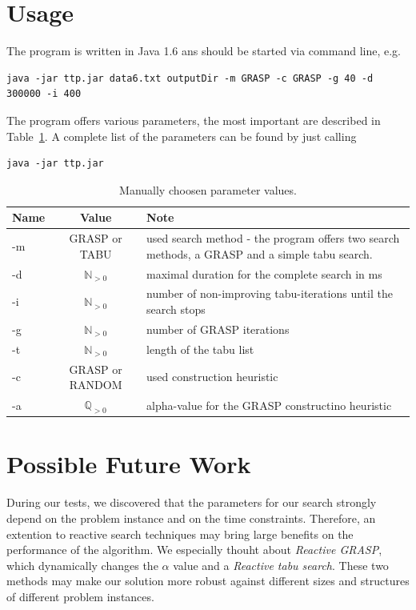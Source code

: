 \documentclass[a4paper,11pt]{article}
\begin{document}
\section{Usage}
The program is written in Java 1.6 ans should be started via command line, e.g.
\small
\lstset{language=sh}
\begin{lstlisting}
java -jar ttp.jar data6.txt outputDir -m GRASP -c GRASP -g 40 -d 300000 -i 400
\end{lstlisting}

The program offers various parameters, the most important are described in Table~\ref{tab:program}. A complete list of the parameters can be found by just calling 
\begin{lstlisting}
java -jar ttp.jar
\end{lstlisting}

\begin{center}
 \begin{table}[htb]
  \begin{tabularx}{\linewidth}{| l | c | X | }
    \hline                       
    Name & Value & Note \\   \hline     \hline    
    -m & GRASP or TABU & used search method - the program offers two search methods, a GRASP and a simple tabu search. \\ \hline    
    -d  & $\mathbb{N}_{ > 0}$ & maximal duration for the complete search in ms \\ \hline    
    -i & $\mathbb{N}_{ > 0}$ & number of non-improving tabu-iterations until the search stops\\ \hline    
    -g & $\mathbb{N}_{ > 0}$ & number of GRASP iterations\\ \hline  
    -t & $\mathbb{N}_{ > 0}$ & length of the tabu list \\ \hline  
    -c & GRASP or RANDOM & used construction heuristic \\ \hline  
    -a & $\mathbb{Q}_{ > 0}$ & alpha-value for the GRASP constructino heuristic \\ \hline  
  \end{tabularx}
    \caption{Manually choosen parameter values.}
  \label{tab:program}
  \end{table}
\end{center}

\section{Possible Future Work}
During our tests, we discovered that the parameters for our search strongly depend on the problem instance and on the time constraints. Therefore,
an extention to reactive search techniques may bring large benefits on the performance of the algorithm. We especially thouht about \emph{Reactive GRASP},
 which dynamically changes the $\alpha$ value and a \emph{Reactive tabu search}. These two methods may make our solution more robust against different
sizes and structures of different problem instances.
\end{document}
